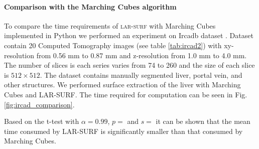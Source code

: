 \paragraph{Comparison with the Marching Cubes algorithm}
To compare the time requirements of \textsc{lar-surf} with Marching Cubes implemented in Python we performed an experiment on Ircadb dataset \cite{ircadb}. Dataset contain 20 Computed Tomography images (see table \ref{tab:ircad2}) with xy-resolution from 0.56 mm to 0.87 mm and z-resolution from 1.0 mm to 4.0 mm. 
The number of slices is each series varies from 74 to 260 and the size of each slice is $512\times512$. 
The dataset contains manually segmented liver, portal vein, and other structures. We performed surface extraction of the liver with Marching Cubes and LAR-SURF. The time required for computation can be seen in Fig. \ref{fig:ircad_comparison}. 

Based on the t-test with $\alpha=0.99$, $p=$ and 
$s=$ it can be shown that the mean time consumed by LAR-SURF is significantly smaller than that consumed by Marching Cubes.



